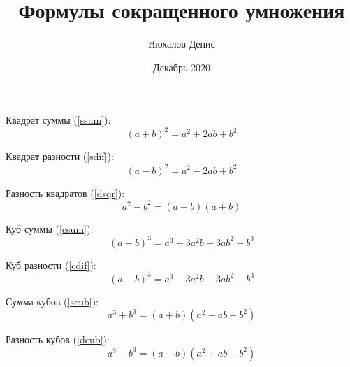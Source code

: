 \documentclass[a4paper,12pt]{article} %
\author{Нюхалов Денис}
\title{Формулы сокращенного умножения}
\date{Декабрь 2020}
\begin{document}
\maketitle

Квадрат суммы (\ref{ssum}):
\begin{equation}
  {(a + b)}^2 = a^2 + 2ab + b^2
  \label{ssum}
\end{equation}

Квадрат разности (\ref{sdif}):
\begin{equation}
  {(a - b)}^2 = a^2 - 2ab + b^2
  \label{sdif}
\end{equation}

Разность квадратов (\ref{dsqr}):
\begin{equation}
  a^2 - b^2 = (a - b) (a + b)
  \label{dsqr}
\end{equation}

Куб суммы (\ref{csum}):
\begin{equation}
  {(a + b)}^3 = a^3 + 3a^2 b + 3a b^2 + b^3
  \label{csum}
\end{equation}

Куб разности (\ref{cdif}):
\begin{equation}
  {(a - b)}^3 = a^3 - 3a^2 b + 3a b^2 - b^3
  \label{cdif}
\end{equation}

Сумма кубов (\ref{scub}):
\begin{equation}
  a^3 + b^3 = (a + b) (a^2 - ab + b^2)
  \label{scub}
\end{equation}

Разность кубов (\ref{dcub}):
\begin{equation}
  a^3 - b^3 = (a - b) (a^2 + ab + b^2)
  \label{dcub}
\end{equation}
\end{document}
